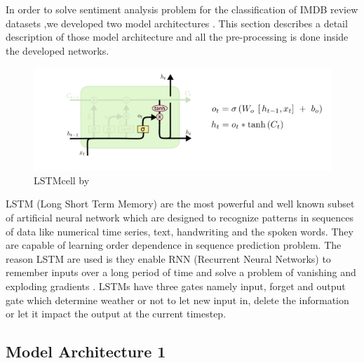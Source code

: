 \documentclass{article}
\begin{document}
In order to solve sentiment analysis  problem for the classification of IMDB review datasets ,we developed two model architectures . This section describes a detail description of those model architecture and all the pre-processing is done inside the developed networks.   
\begin{figure}[H]
    \centering
    \includegraphics[width=\textwidth]{LSTM.PNG}
    \caption{LSTMcell by \cite{LSTM}}
    \label{fig:Lstm}
\end{figure}
LSTM (Long Short Term Memory) are the most powerful and well known subset of artificial neural network which  are designed to recognize patterns in sequences of data like numerical time series, text, handwriting and the spoken words. They are capable of learning order dependence in sequence prediction problem. The reason LSTM are used is they enable RNN (Recurrent Neural Networks) to remember inputs over a long period of time and solve a problem of vanishing and exploding gradients \cite{yu2019review}. LSTMs have three gates namely input, forget and output gate which determine weather or not to let new input in, delete the information or let it impact the output at the current timestep.  


\subsection{Model Architecture 1}
\end{document}
